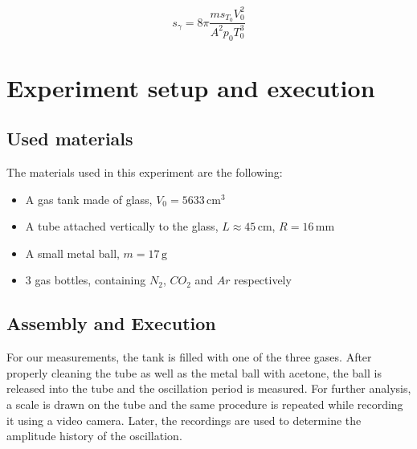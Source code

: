 \documentclass{scrreprt}
\newcommand{\unit}[1]{\ensuremath{\, \mathrm{#1}}}
\begin{document}
\begin{equation}
s_\gamma = 8 \pi \frac{m s_{T_0} V_0^2}{A^2 p_0 T_0^3}
\end{equation} 

\section{Experiment setup and execution}

\subsection{Used materials}
The materials used in this experiment are the following:
\begin{itemize}
\item A gas tank made of glass, $V_0 = 5633 \unit{cm^3}$
\item A tube attached vertically to the glass, $L \approx 45\unit{cm}$, $R = 16 \unit{mm}$
\item A small metal ball, $m = 17 \unit{g}$
\item 3 gas bottles, containing $N_2$, $CO_2$ and $Ar$ respectively
\end{itemize}

\subsection{Assembly and Execution}
For our measurements, the tank is filled with one of the three gases. After properly cleaning the tube as well as the metal ball with acetone, the ball is released into the tube and the oscillation period is measured. For further analysis, a scale is drawn on the tube and the same procedure is repeated while recording it using a video camera. Later, the recordings are used to determine the amplitude history of the oscillation.
\end{document}
